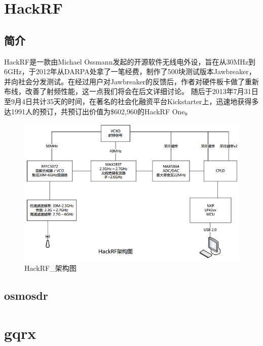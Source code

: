 	\section{HackRF}
		\subsection{简介}
			\par HackRF是一款由Michael Ossmann发起的开源软件无线电外设，旨在从30MHz到6GHz，于2012年从DARPA处拿了一笔经费，制作了500块测试版本Jawbreaker，并向社会分发测试。在经过用户对Jawbreaker的反馈后，作者对硬件板卡做了重新布线，改善了射频性能，这一点我们将会在后文详细讨论。 随后于2013年7月31日至9月4日共计35天的时间，在著名的社会化融资平台Kickstarter上，迅速地获得多达1991人的预订，共预订出价值为\$602,960的HackRF One。
			\begin{figure}[htb]
				\centering
				\includegraphics[width=13cm]{figures/HackRF_Schematic.png}
				\caption{HackRF\_架构图}
				\label{fig:HackRF_架构}
			\end{figure}
		\subsection{osmosdr}
	\section{gqrx}
